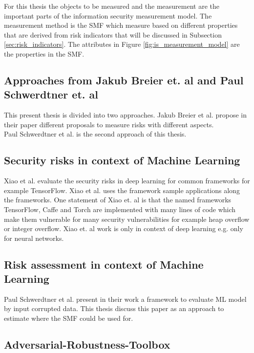 For this thesis the objects to be measured and the measurement are the important parts of the information security measurement model. The measurement method is the SMF which measure based on different properties that are derived from risk indicators that will be discussed in Subsection \ref{sec:risk_indicators}. The attributes in Figure \ref{fig:is_measurement_model} are the properties in the SMF.

\subsection{Approaches from Jakub Breier et. al and Paul Schwerdtner et. al}

This present thesis is divided into two approaches.
Jakub Breier et al. \cite{DBLP:journals/corr/abs-2012-04884} propose in their paper
different proposals to measure risks with different aspects. \\
Paul Schwerdtner et al. \cite{DBLP:journals/corr/abs-2011-04328} is the second approach of this thesis.

\subsection{Security risks in context of Machine Learning}

Xiao et al. \cite{DBLP:conf/sp/XiaoLZX18} evaluate the security risks in deep learning for common frameworks for example TensorFlow. Xiao et al. uses the framework sample applications along the
frameworks. One statement of Xiao et. al is that the named frameworks TensorFlow, Caffe and Torch are implemented with many lines of code which make them vulnerable for many security vulnerabilities
for example heap overflow or integer overflow. Xiao et. al work is only in context of deep learning e.g. only for neural networks.

\subsection{Risk assessment in context of Machine Learning}

Paul Schwerdtner et al. \cite{DBLP:journals/corr/abs-2011-04328} present in their
work a framework to evaluate ML model by input corrupted data. This thesis discuss
this paper as an approach to estimate where the SMF could be used for.

\subsection{Adversarial-Robustness-Toolbox}

